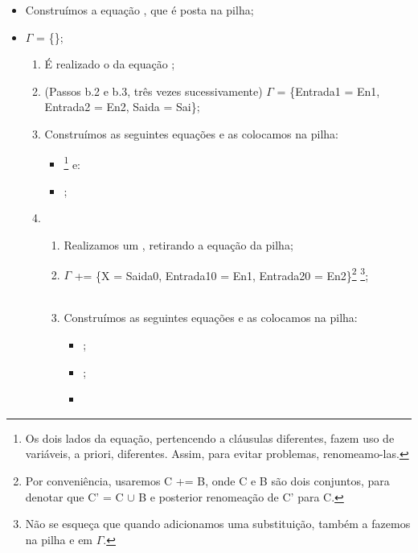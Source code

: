 \documentclass{article}
\begin{document}
\begin{itemize}
  \item Construímos a equação , que é posta na pilha;
  \item $\Gamma$ = \{\};
    \begin{enumerate}
      \item É realizado o  da equação ;
      \item (Passos b.2 e b.3, três vezes sucessivamente) $\Gamma$ = \{Entrada1 = En1, Entrada2 = En2, Saida = Sai\}; %
      \item Construímos as seguintes equações e as colocamos na pilha:
        \begin{itemize}
          \item {}\footnote{Os dois lados da equação, pertencendo a cláusulas diferentes, fazem uso de variáveis, a priori, diferentes. Assim, para evitar problemas, renomeamo-las.} e:
          \item {};
        \end{itemize}
      \item
        \begin{enumerate}
          \item Realizamos um , retirando a equação  da pilha;
          \item $\Gamma$ += \{X = Saida0, Entrada10 = En1, Entrada20 = En2\}\footnote{Por conveniência, usaremos C += B, onde C e B são dois conjuntos, para denotar que C' = C $\cup$ B e posterior renomeação de C' para C.} \footnote{Não se esqueça que quando adicionamos uma substituição, também a fazemos na pilha e em $\Gamma$.};
          \item Construímos as seguintes equações e as colocamos na pilha:
            \begin{itemize}
              \item {};
              \item {};
              \item {}

\end{itemize}
\end{enumerate}
\end{enumerate}
\end{itemize}
\end{document}
